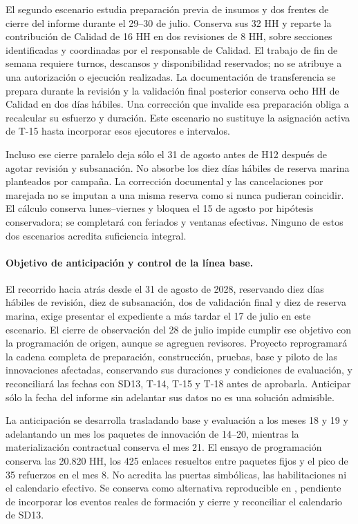El segundo escenario estudia preparación previa de insumos y dos frentes de cierre del informe durante el 29--30 de julio. Conserva sus 32 HH y reparte la contribución de Calidad de 16 HH en dos revisiones de 8 HH, sobre secciones identificadas y coordinadas por el responsable de Calidad. El trabajo de fin de semana requiere turnos, descansos y disponibilidad reservados; no se atribuye a una autorización o ejecución realizadas. La documentación de transferencia se prepara durante la revisión y la validación final posterior conserva ocho HH de Calidad en dos días hábiles. Una corrección que invalide esa preparación obliga a recalcular su esfuerzo y duración. Este escenario no sustituye la asignación activa de T-15 hasta incorporar esos ejecutores e intervalos.

Incluso ese cierre paralelo deja sólo el 31 de agosto antes de H12 después de agotar revisión y subsanación. No absorbe los diez días hábiles de reserva marina planteados por campaña. La corrección documental y las cancelaciones por marejada no se imputan a una misma reserva como si nunca pudieran coincidir. El cálculo conserva lunes--viernes y bloquea el 15 de agosto por hipótesis conservadora; se completará con feriados y ventanas efectivas. Ninguno de estos dos escenarios acredita suficiencia integral.

\paragraph{Objetivo de anticipación y control de la línea base.}
El recorrido hacia atrás desde el 31 de agosto de 2028, reservando diez días hábiles de revisión, diez de subsanación, dos de validación final y diez de reserva marina, exige presentar el expediente a más tardar el 17 de julio en este escenario. El cierre de observación del 28 de julio impide cumplir ese objetivo con la programación de origen, aunque se agreguen revisores. Proyecto reprogramará la cadena completa de preparación, construcción, pruebas, base y piloto de las innovaciones afectadas, conservando sus duraciones y condiciones de evaluación, y reconciliará las fechas con SD13, T-14, T-15 y T-18 antes de aprobarla. Anticipar sólo la fecha del informe sin adelantar sus datos no es una solución admisible.

La anticipación se desarrolla trasladando base y evaluación a los meses 18 y 19 y adelantando un mes los paquetes de innovación de 14--20, mientras la materialización contractual conserva el mes 21. El ensayo de programación conserva las 20.820 HH, los 425 enlaces resueltos entre paquetes fijos y el pico de 35 refuerzos en el mes 8. No acredita las puertas simbólicas, las habilitaciones ni el calendario efectivo. Se conserva como alternativa reproducible en , pendiente de incorporar los eventos reales de formación y cierre y reconciliar el calendario de SD13.

